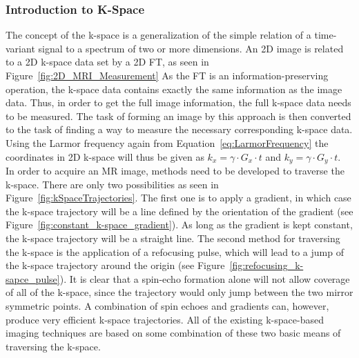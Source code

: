 \subsubsection{Introduction to K-Space}
The concept of the k-space is a generalization of the simple relation of a time-variant signal to a spectrum of two or more dimensions. An 2D image is related to a 2D k-space data set by a 2D FT, as seen in Figure~\ref{fig:2D_MRI_Measurement}
As the FT is an information-preserving operation, the k-space data contains exactly the same information as the image data. Thus, in order to get the full image information, the full k-space data needs to be measured. The task of forming an image by this approach is then converted to the task of finding a way to measure the necessary corresponding k-space data. 
Using the Larmor frequency again from Equation~\ref{eq:LarmorFrequency} the coordinates in 2D k-space will thus be given as $k_x = \gamma \cdot G_x \cdot t$ and $k_y = \gamma \cdot G_y \cdot t$. \\
In order to acquire an MR image, methods need to be developed 
to traverse the k-space.
There are only two possibilities as seen in Figure~\ref{fig:kSpaceTrajectories}. The first one is to apply a gradient, in which case the k-space trajectory will be a line defined by the orientation of the gradient (see Figure~\ref{fig:constant_k-space_gradient}). As long as the gradient is kept constant, the k-space trajectory will be a straight line. 
The second method for traversing the k-space is the application of a refocusing pulse, which will lead to a jump of the k-space trajectory around the origin (see Figure~\ref{fig:refocusing_k-sapce_pulse}). It is clear that a spin-echo formation alone will not allow coverage of all of the k-space, since the trajectory would only jump between the two mirror symmetric points. A combination of spin echoes and gradients can, however, produce very efficient k-space trajectories. All of the existing k-space-based imaging techniques are based on some combination of these two basic means of traversing the k-space. \\
